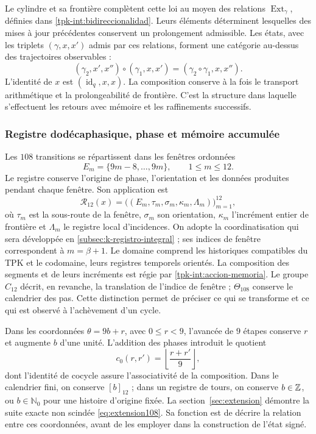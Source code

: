 Le cylindre et sa frontière complètent cette loi au moyen des relations
\(\operatorname{Ext}_\gamma\), définies dans
\ref{tpk-int:bidireccionalidad}. Leurs éléments déterminent lesquelles
des mises à jour précédentes conservent un prolongement admissible.
Les états, avec les triplets \((\gamma,x,x')\) admis par
ces relations, forment une catégorie au-dessus des trajectoires observables :
\[
 (\gamma_2,x',x'')\circ(\gamma_1,x,x')
     =(\gamma_2\circ\gamma_1,x,x'').
\]
L'identité de \(x\) est \((\operatorname{id}_q,x,x)\). La composition conserve à la fois le transport arithmétique et la prolongeabilité de frontière. C'est la structure dans laquelle s'effectuent les retours avec mémoire et les raffinements successifs.

\subsubsection{Registre dodécaphasique, phase et mémoire accumulée}
\label{tpk-int:dodecafase}

Les \(108\) transitions se répartissent dans les fenêtres ordonnées
\[
 E_m=\{9m-8,\ldots,9m\},\qquad 1\leq m\leq12.
\]
Le registre conserve l'origine de phase, l'orientation et les données
produites pendant chaque fenêtre. Son application est
\[
 \mathcal R_{12}(x)=
 \bigl((E_m,\tau_m,\sigma_m,\kappa_m,\Lambda_m)\bigr)_{m=1}^{12},
\]
où \(\tau_m\) est la sous-route de la fenêtre, \(\sigma_m\) son
orientation, \(\kappa_m\) l'incrément entier de frontière et
\(\Lambda_m\) le registre local d'incidences. On adopte la coordinatisation
qui sera développée en \ref{subsec:k-registro-integral} ; ses indices
de fenêtre correspondent à \(m=\beta+1\).
Le domaine comprend les historiques compatibles
du TPK et le codomaine, leurs registres temporels orientés. La
composition des segments et de leurs incréments est régie par
\eqref{tpk-int:accion-memoria}. Le groupe \(C_{12}\) décrit, en
revanche, la translation de l'indice de fenêtre ; \(\Theta_{108}\) conserve
le calendrier des pas. Cette distinction permet de préciser ce qui se transforme
et ce qui est observé à l'achèvement d'un cycle.

Dans les coordonnées \(\theta=9b+r\), avec \(0\leq r<9\), l'avancée
de \(9\) étapes conserve \(r\) et augmente \(b\) d'une unité.
L'addition des phases introduit le quotient
\[
 c_0(r,r')=\left\lfloor\frac{r+r'}9\right\rfloor,
\]
dont l'identité de cocycle assure l'associativité de la composition. Dans le calendrier fini, on conserve \([b]_{12}\) ; dans un registre de tours, on conserve \(b\in\mathbb Z\), ou \(b\in\mathbb N_0\) pour une histoire d'origine fixée. La section~\ref{sec:extension} démontre la suite exacte non scindée \eqref{eq:extension108}. Sa fonction est de décrire la relation entre ces coordonnées, avant de les employer dans la construction de l'état signé.

